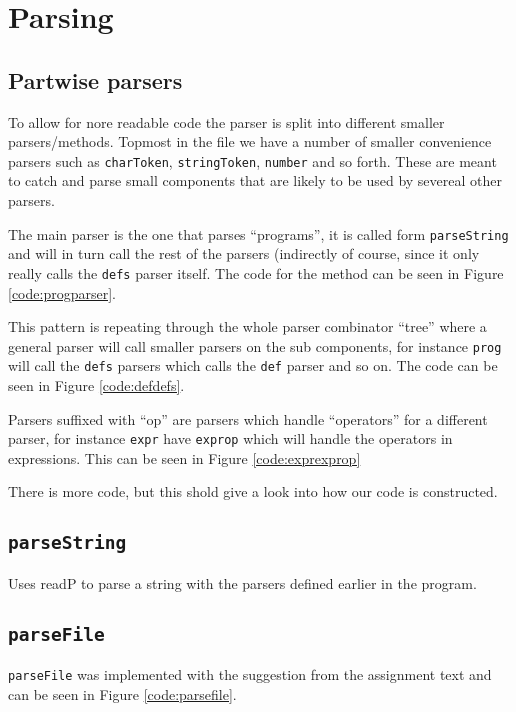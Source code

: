 \section{Parsing}

\subsection{Partwise parsers}
To allow for nore readable code the parser is split into different smaller
parsers/methods. Topmost in the file we have a number of smaller convenience
parsers such as \texttt{charToken}, \texttt{stringToken}, \texttt{number} and so
forth. These are meant to catch and parse small components that are likely to be
used by severeal other parsers.

The main parser is the one that parses ``programs'', it is called form
\texttt{parseString} and will in turn call the rest of the parsers (indirectly
of course, since it only really calls the \texttt{defs} parser itself. The code
for the method can be seen in Figure \ref{code:progparser}.


This pattern is repeating through the whole parser combinator ``tree'' where a
general parser will call smaller parsers on the sub components, for instance
\texttt{prog} will call the \texttt{defs} parsers which calls the \texttt{def}
parser and so on. The code can be seen in Figure \ref{code:defdefs}.



Parsers suffixed with ``op'' are parsers which handle ``operators'' for a
different parser, for instance \texttt{expr} have \texttt{exprop} which will
handle the operators in expressions. This can be seen in Figure
\ref{code:exprexprop}


There is more code, but this shold give a look into how our code is constructed.


\subsection{\texttt{parseString}}
Uses readP to parse a string with the parsers defined earlier in the program.




\subsection{\texttt{parseFile}}
\texttt{parseFile} was implemented with the suggestion from the assignment text
and can be seen in Figure \ref{code:parsefile}.

